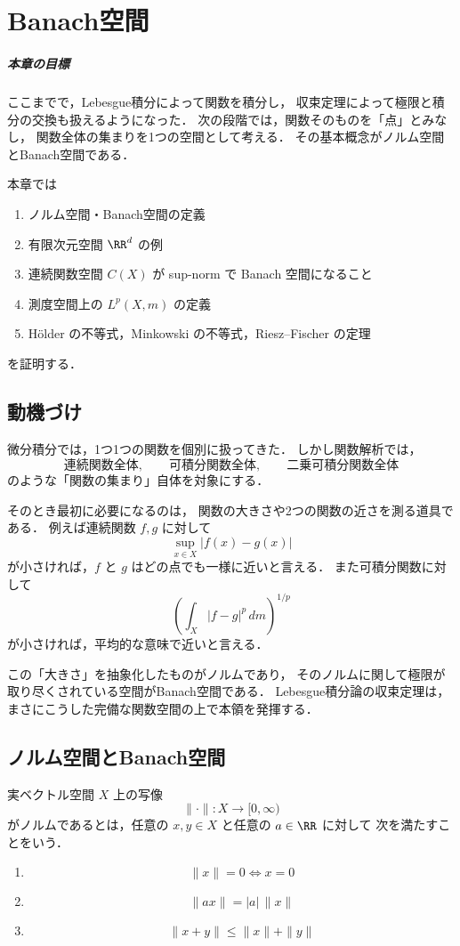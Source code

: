 \chapter{Banach空間}

\paragraph{本章の目標}
ここまでで，Lebesgue積分によって関数を積分し，
収束定理によって極限と積分の交換も扱えるようになった．
次の段階では，関数そのものを「点」とみなし，
関数全体の集まりを1つの空間として考える．
その基本概念がノルム空間とBanach空間である．

本章では
\begin{enumerate}
    \item ノルム空間・Banach空間の定義
    \item 有限次元空間 $\RR^d$ の例
    \item 連続関数空間 $C(X)$ が sup-norm で Banach 空間になること
    \item 測度空間上の $L^p(X,m)$ の定義
    \item Hölder の不等式，Minkowski の不等式，Riesz--Fischer の定理
\end{enumerate}
を証明する．

\section{動機づけ}

微分積分では，1つ1つの関数を個別に扱ってきた．
しかし関数解析では，
\[
\text{連続関数全体},\qquad
\text{可積分関数全体},\qquad
\text{二乗可積分関数全体}
\]
のような「関数の集まり」自体を対象にする．

そのとき最初に必要になるのは，
関数の大きさや2つの関数の近さを測る道具である．
例えば連続関数 $f,g$ に対して
\[
\sup_{x\in X}|f(x)-g(x)|
\]
が小さければ，$f$ と $g$ はどの点でも一様に近いと言える．
また可積分関数に対して
\[
\left(\int_X |f-g|^p\,dm\right)^{1/p}
\]
が小さければ，平均的な意味で近いと言える．

この「大きさ」を抽象化したものがノルムであり，
そのノルムに関して極限が取り尽くされている空間がBanach空間である．
Lebesgue積分論の収束定理は，
まさにこうした完備な関数空間の上で本領を発揮する．

\section{ノルム空間とBanach空間}

\begin{definition}[ノルム]
実ベクトル空間 $X$ 上の写像
\[
\|\cdot\|:X\to [0,\infty)
\]
がノルムであるとは，任意の $x,y\in X$ と任意の $a\in\RR$ に対して
次を満たすことをいう．
\begin{enumerate}
    \item
    \[
    \|x\|=0 \iff x=0
    \]
    \item
    \[
    \|ax\|=|a|\,\|x\|
    \]
    \item
    \[
    \|x+y\|\le \|x\|+\|y\|
    \]
\end{enumerate}
\end{definition}

